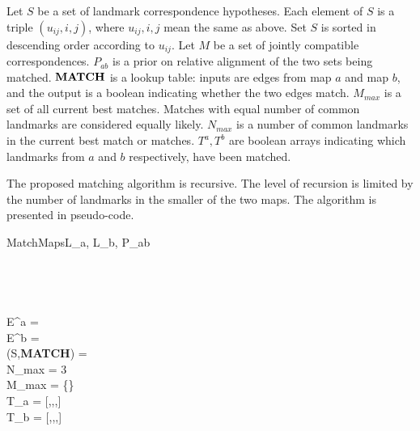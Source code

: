 Let $S$ be a set of landmark correspondence hypotheses. Each element
of $S$ is a triple $(u_{ij}, i, j)$, where $u_{ij},i,j$ mean the same
as above. Set $S$ is sorted in descending order according to
$u_{ij}$. Let $M$ be a set of jointly compatible
correspondences. $P_{ab}$ is a prior on relative alignment of the two
sets being matched. ${\bf MATCH}$ is a lookup table: inputs are edges
from map $a$ and map $b$, and the output is a boolean indicating
whether the two edges match. $M_{max}$ is a set of all current best
matches. Matches with equal number of common landmarks are considered
equally likely. $N_{max}$ is a number of common landmarks in the
current best match or matches. $T^a,T^b$ are boolean arrays indicating
which landmarks from $a$ and $b$ respectively, have been matched.

The proposed matching algorithm is recursive. The level of recursion
is limited by the number of landmarks in the smaller of the two
maps. The algorithm is presented in pseudo-code.

\begin{pseudocode}{MatchMaps}{L_a, L_b, P_{ab}}
 \\
 \\
 \\
 \\
\\
 E^a = \\
 E^b = \\
 (S,{\bf MATCH}) = \\

 N_{max} = 3 \quad {} \\
 M_{max} = \{\}\\
 T_a = [\FALSE,\FALSE,\cdots,\FALSE]\\
 T_b = [\FALSE,\FALSE,\cdots,\FALSE]\\

 \\

\end{pseudocode}

